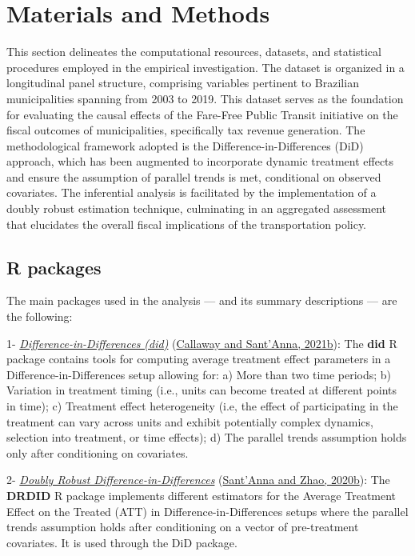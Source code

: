 \documentclass[12pt, a4paper, twoside]{article}
\numberwithin{equation}{subsection} %
\begin{document}
\newpage

\hypertarget{sec-materials-methods}{%
\section{Materials and Methods}\label{sec-materials-methods}}

This section delineates the computational resources, datasets, and
statistical procedures employed in the empirical investigation. The
dataset is organized in a longitudinal panel structure, comprising
variables pertinent to Brazilian municipalities spanning from 2003 to
2019. This dataset serves as the foundation for evaluating the causal
effects of the Fare-Free Public Transit initiative on the fiscal
outcomes of municipalities, specifically tax revenue generation. The
methodological framework adopted is the Difference-in-Differences (DiD)
approach, which has been augmented to incorporate dynamic treatment
effects and ensure the assumption of parallel trends is met, conditional
on observed covariates. The inferential analysis is facilitated by the
implementation of a doubly robust estimation technique, culminating in
an aggregated assessment that elucidates the overall fiscal implications
of the transportation policy.

\hypertarget{sec-r-packages}{%
\subsection{R packages}\label{sec-r-packages}}

The main packages used in the analysis --- and its summary descriptions
--- are the following:

1- \textit{\underline{Difference-in-Differences (did)}}
(\protect\hyperlink{ref-did_r}{Callaway and Sant'Anna, 2021b}): The
\textbf{did} R package contains tools for computing average treatment
effect parameters in a Difference-in-Differences setup allowing for: a)
More than two time periods; b) Variation in treatment timing (i.e.,
units can become treated at different points in time); c) Treatment
effect heterogeneity (i.e, the effect of participating in the treatment
can vary across units and exhibit potentially complex dynamics,
selection into treatment, or time effects); d) The parallel trends
assumption holds only after conditioning on covariates.

2- \textit{\underline{Doubly Robust Difference-in-Differences}}
(\protect\hyperlink{ref-DRDID_r}{Sant'Anna and Zhao, 2020b}): The
\textbf{DRDID} R package implements different estimators for the Average
Treatment Effect on the Treated (ATT) in Difference-in-Differences
setups where the parallel trends assumption holds after conditioning on
a vector of pre-treatment covariates. It is used through the DiD
package.
\end{document}
